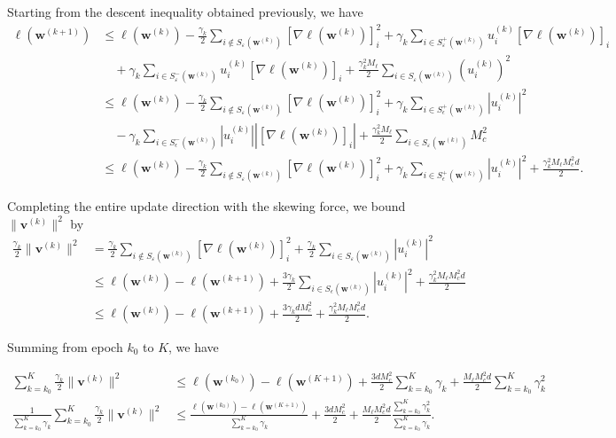\documentclass[10pt,a4paper]{article}
\begin{document}
Starting from the descent inequality obtained previously, we have
\begin{align*}
  \ell(\mathbf{w}^{(k+1)}) & \leq \ell(\mathbf{w}^{(k)})-\frac{\gamma_k}{2}\sum\limits_{i\notin S_\varepsilon(\mathbf{w}^{(k)})} [\nabla \ell(\mathbf{w}^{(k)})]_i^2+\gamma_k \sum\limits_{i\in S_\varepsilon^+(\mathbf{w}^{(k)})} u_i^{(k)} [\nabla \ell(\mathbf{w}^{(k)})]_i\\
  &\quad+\gamma_k \sum\limits_{i\in S_\varepsilon^-(\mathbf{w}^{(k)})} u_i^{(k)} [\nabla \ell(\mathbf{w}^{(k)})]_i +\frac{\gamma_k^2 M_\ell}{2}\sum\limits_{i\in S_\varepsilon(\mathbf{w}^{(k)})} (u_i^{(k)})^2\\
  & \leq \ell(\mathbf{w}^{(k)})-\frac{\gamma_k}{2}\sum\limits_{i\notin S_\varepsilon(\mathbf{w}^{(k)})} [\nabla \ell(\mathbf{w}^{(k)})]_i^2+\gamma_k \sum\limits_{i\in S_\epsilon^+(\mathbf{w}^{(k)})} |u_i^{(k)}|^2\\
  &\quad -\gamma_k \sum\limits_{i\in S_\epsilon^-(\mathbf{w}^{(k)})} |u_i^{(k)}| |[\nabla \ell(\mathbf{w}^{(k)})]_i|+\frac{\gamma_k^2 M_\ell}{2}\sum\limits_{i\in S_\varepsilon(\mathbf{w}^{(k)})} M_c^2\\
  & \leq \ell(\mathbf{w}^{(k)})-\frac{\gamma_k}{2}\sum\limits_{i\notin S_\varepsilon(\mathbf{w}^{(k)})} [\nabla \ell(\mathbf{w}^{(k)})]_i^2+\gamma_k \sum\limits_{i\in S_\epsilon^+(\mathbf{w}^{(k)})} |u_i^{(k)}|^2 + \frac{\gamma_k^2 M_\ell M_c^2 d}{2}.
\end{align*}

Completing the entire update direction with the skewing force, we bound $\|\mathbf{v}^{(k)}\|^2$ by
\begin{align*}
  \frac{\gamma_k}{2}\|\mathbf{v}^{(k)}\|^2&=\frac{\gamma_k}{2}\sum\limits_{i\notin S_\varepsilon(\mathbf{w}^{(k)})} [\nabla \ell(\mathbf{w}^{(k)})]_i^2+\frac{\gamma_k}{2}\sum\limits_{i\in S_\varepsilon(\mathbf{w}^{(k)})} |u_i^{(k)}|^2 \\
  & \leq \ell(\mathbf{w}^{(k)})-\ell(\mathbf{w}^{(k+1)})+\frac{3\gamma_k}{2} \sum\limits_{i\in S_\epsilon(\mathbf{w}^{(k)})} |u_i^{(k)}|^2 + \frac{\gamma_k^2 M_\ell M_c^2 d}{2}\\
  & \leq \ell(\mathbf{w}^{(k)})-\ell(\mathbf{w}^{(k+1)})+\frac{3\gamma_k d M_c^2}{2}+\frac{\gamma_k^2 M_\ell M_c^2 d}{2}.
\end{align*} 

Summing from epoch $k_0$ to $K$, we have

\begin{align*}
  \sum\limits_{k=k_0}^{K}\frac{\gamma_k}{2}\|\mathbf{v}^{(k)}\|^2  & \leq \ell(\mathbf{w}^{(k_0)})-\ell(\mathbf{w}^{(K+1)})+\frac{3d M_c^2}{2}\sum\limits_{k=k_0}^K \gamma_k +\frac{M_\ell M_c^2 d}{2}\sum\limits_{k=k_0}^K\gamma_k^2 \\
  \frac{1}{\sum_{k=k_0}^{K}\gamma_k}\sum\limits_{k=k_0}^{K}\frac{\gamma_k}{2}\|\mathbf{v}^{(k)}\|^2  & \leq \frac{\ell(\mathbf{w}^{(k_0)})-\ell(\mathbf{w}^{(K+1)})}{{\sum_{k=k_0}^{K}\gamma_k}}+\frac{3d M_c^2}{2}+\frac{M_\ell M_c^2 d}{2}\frac{\sum_{k=k_0}^K\gamma_k^2}{\sum_{k=k_0}^{K}\gamma_k}.
\end{align*}
\end{document}
